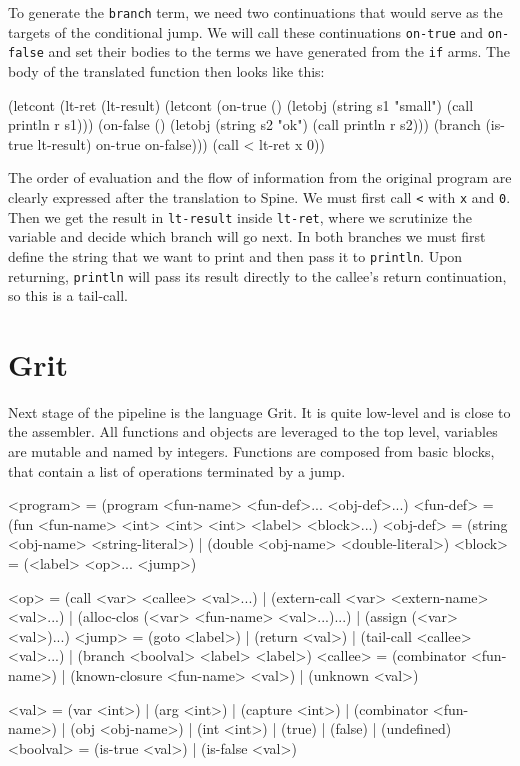 To generate the \texttt{branch} term, we need two continuations that would serve
as the targets of the conditional jump. We will call these continuations
\texttt{on-true} and \texttt{on-false} and set their bodies to the terms
we have generated from the \texttt{if} arms. The body of the translated function
then looks like this:

\begin{spine}
(letcont (lt-ret (lt-result)
            (letcont (on-true ()
                        (letobj (string s1 "small") (call println r s1)))
                     (on-false ()
                        (letobj (string s2 "ok") (call println r s2)))
              (branch (is-true lt-result) on-true on-false)))
  (call < lt-ret x 0))
\end{spine}

The order of evaluation and the flow of information from the original program
are clearly expressed after the translation to Spine.  We must first call
\texttt{<} with \texttt{x} and \texttt{0}. Then we get the result in
\texttt{lt-result} inside \texttt{lt-ret}, where we scrutinize the variable and
decide which branch will go next. In both branches we must first define the
string that we want to print and then pass it to \texttt{println}. Upon
returning, \texttt{println} will pass its result directly to the callee's return
continuation, so this is a tail-call.

\section{Grit}

Next stage of the pipeline is the language Grit. It is quite low-level and is
close to the assembler. All functions and objects are leveraged to the top level,
variables are mutable and named by integers. Functions are composed from basic
blocks, that contain a list of operations terminated by a jump.

\begin{gram}
<program>   = (program <fun-name> <fun-def>... <obj-def>...)
<fun-def>   = (fun <fun-name> <int> <int> <int> <label> <block>...)
<obj-def>   = (string <obj-name> <string-literal>)
            | (double <obj-name> <double-literal>)
<block>     = (<label> <op>... <jump>)

<op>        = (call <var> <callee> <val>...)
            | (extern-call <var> <extern-name> <val>...)
            | (alloc-clos (<var> <fun-name> <val>...)...)
            | (assign (<var> <val>)...)
<jump>      = (goto <label>)
            | (return <val>)
            | (tail-call <callee> <val>...)
            | (branch <boolval> <label> <label>)
<callee>    = (combinator <fun-name>)
            | (known-closure <fun-name> <val>)
            | (unknown <val>)

<val>       = (var <int>)
            | (arg <int>)
            | (capture <int>)
            | (combinator <fun-name>)
            | (obj <obj-name>)
            | (int <int>)
            | (true)
            | (false)
            | (undefined)
<boolval>   = (is-true <val>) | (is-false <val>)
\end{gram}


